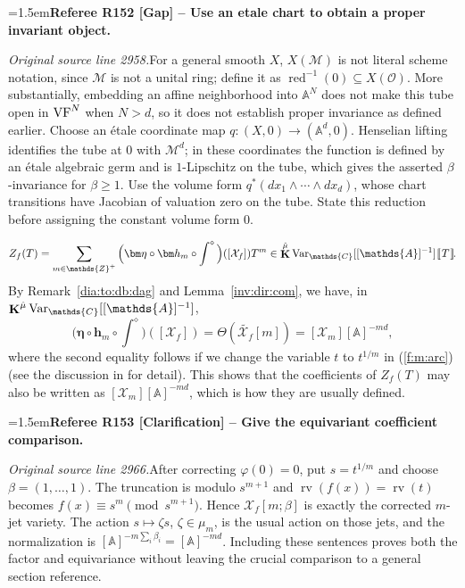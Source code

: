 \documentclass[12pt]{amsart}
\newcommand{\RefereeRemark}[4]{%
  \par\medskip\begingroup\normalfont\small\color{RefereePurple}%
  \emergencystretch=1.5em\noindent\textbf{Referee R#1 [#2] -- #3.}\par\nobreak\noindent #4\par
  \endgroup\medskip
}
\theoremstyle{plain}
\theoremstyle{definition}
\theoremstyle{remark}
\numberwithin{equation}{section}
\theoremstyle{plain}
\newcommand{\VF}{\textup{VF}}
\newcommand{\MM}{\mdl M}
\newcommand{\OO}{\mdl O}
\newcommand{\Z}{\mathds{Z}}
\newcommand{\A}{\mathds{A}}
\newcommand{\C}{\mathds{C}}
\newcommand{\0}{\emptyset}
\newcommand{\dbra}[1]{%
  \,[\mkern-6.8mu[\, #1 \,]\mkern-6.8mu]}
\newcommand{\mdl}[1]{\mathcal{#1}}  %
\DeclareMathOperator{\rv}{rv}
\DeclareMathOperator{\ggk}{\mathbf{K}}
\newcommand{\var}{\textup{Var}}
\newcommand{\gmv}{\ggk^{\hat \mu}\var_{\C}}
\begin{document}
\RefereeRemark{152}{Gap}{Use an etale chart to obtain a proper invariant object}{%
\textit{Original source line 2958.}\quad For a general smooth $X$, $X(\MM)$ is not literal scheme notation, since $\MM$ is not a unital ring; define it as $\operatorname{red}^{-1}(0)\subseteq X(\OO)$. More substantially, embedding an affine neighborhood into $\A^N$ does not make this tube open in $\VF^N$ when $N>d$, so it does not establish proper invariance as defined earlier. Choose an \'etale coordinate map $q:(X,0)\to(\A^d,0)$. Henselian lifting identifies the tube at $0$ with $\MM^d$; in these coordinates the function is defined by an \'etale algebraic germ and is $1$-Lipschitz on the tube, which gives the asserted $\beta$-invariance for $\beta\geq1$. Use the volume form $q^*(dx_1\wedge\cdots\wedge dx_d)$, whose chart transitions have Jacobian of valuation zero on the tube. State this reduction before assigning the constant volume form $0$.
}
\begin{equation}\label{def:zeta}
Z_f(T) = \sum_{m \in \Z^+} \Big(\bm \eta \circ \bm h_m \circ \int^{\diamond} \Big)([\mdl X_f]) T^m \in \gmv[[\A]^{-1}] \dbra T.
\end{equation}
By Remark~\ref{dia:to:db:dag} and Lemma~\ref{inv:dir:com}, we have, in $\gmv[[\A]^{-1}]$,
\begin{equation}\label{z:coeff:change}
 \Big(\bm \eta \circ \bm h_m \circ \int^{\diamond} \Big)([\mdl X_f]) = \Theta(\tilde{\mdl X_f}[m]) = [\mdl X_{m}][\A]^{-md},
\end{equation}
where the second equality follows if  we change the variable $t$ to $t^{1/m}$ in (\ref{f:m:arc}) (see the discussion in \cite[\S~6.2]{hru:loe:lef} for  detail). This shows that the coefficients of $Z_f(T)$ may also be written as $[\mdl X_{m}][\A]^{-md}$, which is how they are usually defined.

\RefereeRemark{153}{Clarification}{Give the equivariant coefficient comparison}{%
\textit{Original source line 2966.}\quad After correcting $\varphi(0)=0$, put $s=t^{1/m}$ and choose $\beta=(1,\ldots,1)$. The truncation is modulo $s^{m+1}$ and $\rv(f(x))=\rv(t)$ becomes $f(x)\equiv s^m\pmod{s^{m+1}}$. Hence $\mdl X_f[m;\beta]$ is exactly the corrected $m$-jet variety. The action $s\mapsto\zeta s$, $\zeta\in\mu_m$, is the usual action on those jets, and the normalization is $[\A]^{-m\sum_i\beta_i}=[\A]^{-md}$. Including these sentences proves both the factor and equivariance without leaving the crucial comparison to a general section reference.
}
\end{document}
